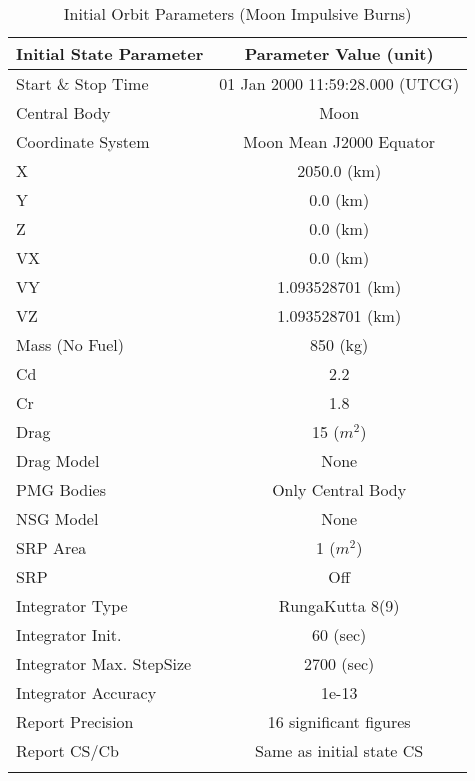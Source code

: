 \begin{table}[htbp!]
\centering \caption{Initial Orbit Parameters (Moon Impulsive Burns)}
      \begin{tabular}{lc}
      \hline\hline
            Initial State Parameter & Parameter Value (unit)\\
            \hline
            Start \& Stop Time & 01 Jan 2000 11:59:28.000 (UTCG)\\
            Central Body & Moon\\
            Coordinate System & Moon Mean J2000 Equator\\
            X & 2050.0 (km)\\
            Y & 0.0 (km)\\
            Z & 0.0 (km)\\
            VX & 0.0 (km)\\
            VY & 1.093528701 (km)\\
            VZ & 1.093528701 (km)\\
            Mass (No Fuel) & 850 (kg)\\
            Cd & 2.2\\
            Cr & 1.8\\
            Drag & 15 ($m^2$)\\
            Drag Model & None\\
            PMG Bodies & Only Central Body\\
            NSG Model & None\\
            SRP Area & 1 ($m^2$)\\
            SRP & Off\\
            Integrator Type & RungaKutta 8(9)\\
            Integrator Init. & 60 (sec)\\
            Integrator Max. StepSize & 2700 (sec)\\
            Integrator Accuracy & 1e-13\\
            Report Precision & 16 significant figures\\
            Report CS/Cb & Same as initial state CS\\
      \hline\hline
      \label{Table: InitDVStateMoonImpulse}
\end{tabular}
\end{table}

